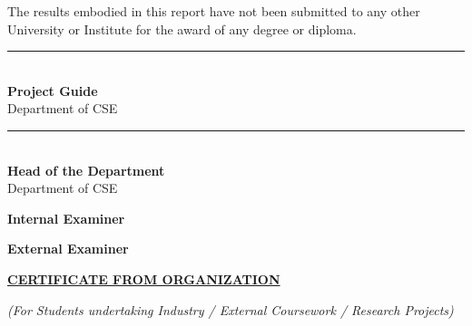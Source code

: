 \documentclass[12pt,a4paper]{report}
\begin{document}
\vspace{0.5cm}
\noindent The results embodied in this report have not been submitted to any other University or Institute for the award of any degree or diploma.

\vspace{3cm}
\noindent
\begin{minipage}{0.45\textwidth}
    \begin{flushleft}
        \rule{5cm}{0.5pt}\\[4pt]
        \textbf{Project Guide}\\[2pt]
        Department of CSE
    \end{flushleft}
\end{minipage}
\hfill
\begin{minipage}{0.45\textwidth}
    \begin{flushright}
        \rule{5cm}{0.5pt}\\[4pt]
        \textbf{Head of the Department}\\[2pt]
        Department of CSE
    \end{flushright}
\end{minipage}

\vspace{2cm}
\noindent
\begin{minipage}{0.45\textwidth}
    \begin{flushleft}
        \textbf{Internal Examiner}
    \end{flushleft}
\end{minipage}
\hfill
\begin{minipage}{0.45\textwidth}
    \begin{flushright}
        \textbf{External Examiner}
    \end{flushright}
\end{minipage}
\newpage

\thispagestyle{frontmatterstyle}
\begin{center}
    \vspace*{0.5cm}
    {\fontsize{14}{18}\selectfont\bfseries\underline{CERTIFICATE FROM ORGANIZATION}\par}
    \vspace{0.5cm}
    {\fontsize{12}{15}\selectfont\textit{(For Students undertaking Industry / External Coursework / Research Projects)}\par}
\end{center}
\end{document}

